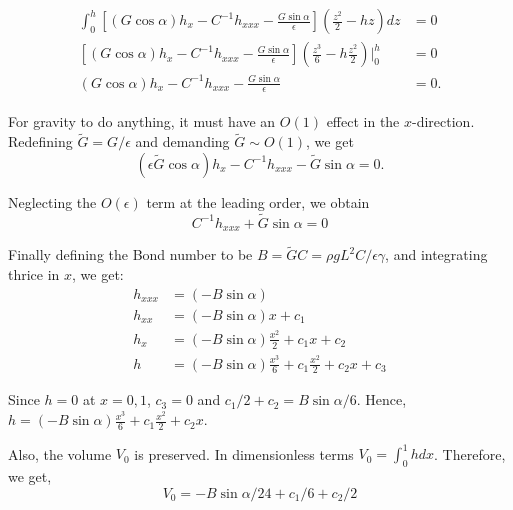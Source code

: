 \documentclass{article}
\begin{document}
\begin{align}\label{eq:get_h}
 \begin{split}
  \int_{0}^{h}\left[(G\cos{\alpha}) h_{x} - C^{-1}h_{xxx} - \frac{G\sin{\alpha}}{\epsilon}\right]\left(\frac{z^{2}}{2} - hz \right) dz &= 0\\
  \left[(G\cos{\alpha}) h_{x} - C^{-1}h_{xxx} - \frac{G\sin{\alpha}}{\epsilon}\right]\left(\frac{z^{3}}{6} - h\frac{z^{2}}{2} \right)\bigg|_{0}^{h} &= 0\\
  (G\cos{\alpha}) h_{x} - C^{-1}h_{xxx} - \frac{G\sin{\alpha}}{\epsilon} &= 0.
 \end{split}
\end{align}

For gravity to do anything, it must have an $O(1)$ effect in the $x$-direction. Redefining $\tilde{G} = G/\epsilon$ and demanding $\tilde{G} \sim O(1)$, we get
\begin{equation}\label{eq:rescale_G}
 (\epsilon \tilde{G}\cos{\alpha}) h_{x} - C^{-1}h_{xxx} - \tilde{G}\sin{\alpha} = 0.
\end{equation}

Neglecting the $O(\epsilon)$ term at the leading order, we obtain
\begin{equation}\label{eq:pendant_h}
 C^{-1}h_{xxx} + \tilde{G}\sin{\alpha} = 0
\end{equation}

Finally defining the Bond number to be $B = \tilde{G} C = \rho g L^{2} C/\epsilon \gamma$, and integrating thrice in $x$, we get:
\begin{align}\label{eq:pendant_integrate_h}
 h_{xxx} &= (-B \sin{\alpha})\\
 h_{xx}  &= (-B \sin{\alpha}) x + c_{1}\\
 h_{x}   &=(-B \sin{\alpha}) \frac{x^{2}}{2} + c_{1} x + c_{2}\\
 h &= (-B \sin{\alpha}) \frac{x^{3}}{6} + c_{1} \frac{x^{2}}{2} + c_{2} x + c_{3}
\end{align}

Since $h = 0$ at $x=0, 1$, $c_{3} = 0$ and $c_{1}/2 + c_{2} = B\sin{\alpha}/6$. Hence, $h = (-B \sin{\alpha}) \frac{x^{3}}{6} + c_{1} \frac{x^{2}}{2} + c_{2} x$. 

Also, the volume $V_{0}$ is preserved. In dimensionless terms $V_{0} = \int_{0}^{1} hdx$.
Therefore, we get, 
\begin{equation}\label{eq:pendant_conserve_V}
 V_{0} = -B\sin{\alpha}/24 + c_{1}/6 + c_{2}/2
\end{equation}
\end{document}
